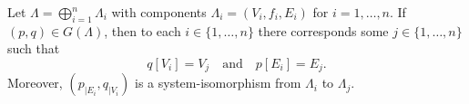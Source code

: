 Let $\Lambda = \bigoplus_{i=1}^{n} \Lambda_i$ with components $\Lambda_i = (V_i, f_i, E_i)$ for $i = 1, \ldots, n$. If $(p, q) \in G(\Lambda)$, then to each $i \in \{1, \ldots, n\}$ there corresponds some $j \in \{1, \ldots, n\}$ such that
$$q[V_i] = V_j \quad \text{and} \quad p[E_i] = E_j.$$
Moreover, $(p_{|E_i}, q_{|V_i})$ is a system-isomorphism from $\Lambda_i$ to $\Lambda_j$.
